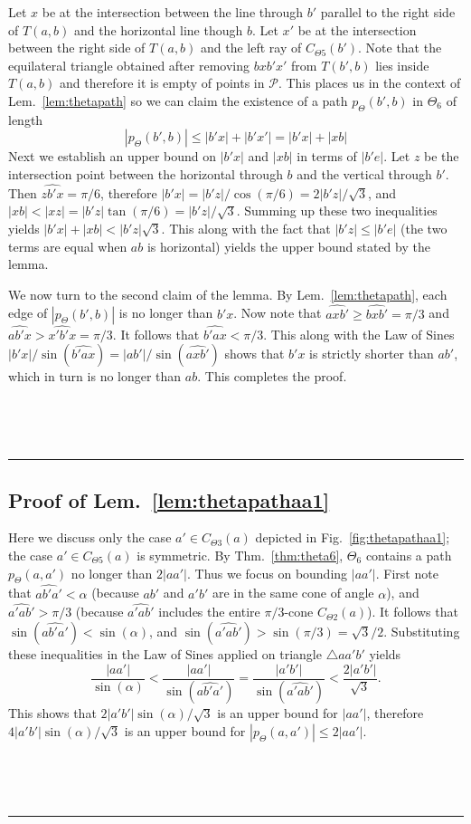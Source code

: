 \documentclass[11pt]{article}
\newcommand\cone{{C}}
\newcommand\Pt{\mathcal P}
\newcommand\ang[1]{\widehat{#1}}
\newcommand{\qed}{\rule{0.5em}{1.5ex}}
\newcommand{\fqed}{{\hfill~\qed}}
\newcommand{\eproof}{{\hfill~\fqed} \vspace{1em}}
\begin{document}
Let $x$ be at the intersection between the line through $b'$ parallel to the right side of $T(a, b)$ and the horizontal line though $b$. Let $x'$ be at the intersection between the right side of $T(a, b)$ and the left ray of $\cone_{\Theta5}(b')$. Note that the equilateral triangle obtained after removing $bxb'x'$ from $T(b',b)$ lies inside $T(a, b)$ and therefore it is empty of points in $\Pt$.
This places us in the context of Lem.~\ref{lem:thetapath} so we can claim the existence of a path $p_\Theta(b',b)$ in $\Theta_6$ of length
\begin{equation}
|p_\Theta(b',b)| \le |b'x| + |b'x'| = |b'x| + |xb|
\label{eq:pbb0}
\end{equation}
Next we establish an upper bound on $|b'x|$ and $|xb|$ in terms of $|b'e|$. Let $z$ be the intersection point between the horizontal through $b$ and the vertical through $b'$. Then $\ang{zb'x} = \pi/6$, therefore $|b'x| = |b'z| / \cos(\pi/6) = 2|b'z|/\sqrt{3}$, and
$|xb| < |xz| = |b'z|\tan(\pi/6) = |b'z| / \sqrt{3}$. Summing up these two inequalities yields
$|b'x| + |xb| < |b'z|\sqrt{3}$. This along with the fact that $|b'z| \le |b'e|$ (the two terms are equal when $ab$ is horizontal) yields the upper bound stated by the lemma.

We now turn to the second claim of the lemma. By Lem.~\ref{lem:thetapath}, each edge of $|p_\Theta(b',b)|$ is no longer than $b'x$. Now note that $\ang{axb'} \ge \ang{bxb'} = \pi/3$ and $\ang{ab'x} > \ang{x'b'x} = \pi/3$. It follows that $\ang{b'ax} < \pi/3$. This along with the Law of Sines $|b'x|/\sin(\ang{b'ax}) = |ab'|/\sin(\ang{axb'})$ shows that $b'x$ is strictly shorter than $ab'$, which in turn is no longer than $ab$. This completes the proof.
\eproof

\subsection{Proof of Lem.~\ref{lem:thetapathaa1}}
Here we discuss only the case $a' \in \cone_{\Theta3}(a)$ depicted in Fig.~\ref{fig:thetapathaa1}; the case $a' \in \cone_{\Theta5}(a)$ is symmetric.
By Thm.~\ref{thm:theta6}, $\Theta_6$ contains a path $p_\Theta(a, a')$ no longer than $2|aa'|$. Thus we focus on bounding $|aa'|$.
First note that $\ang{ab'a'} < \alpha$ (because $ab'$ and $a'b'$ are in the same cone of angle $\alpha$), and $\ang{a'ab'} > \pi/3$ (because $\ang{a'ab'}$ includes the entire $\pi/3$-cone $\cone_{\Theta2}(a)$).
It follows that
$\sin(\ang{ab'a'}) < \sin(\alpha)$, and $\sin(\ang{a'ab'}) > \sin(\pi/3) = \sqrt{3}/2$. Substituting these inequalities in the Law of Sines applied on triangle $\triangle aa'b'$ yields
\[\frac{|aa'|}{\sin(\alpha)} < \frac{|aa'|}{\sin(\ang{ab'a'})} = \frac{|a'b'|}{\sin(\ang{a'ab'})} < \frac{2|a'b'|}{\sqrt{3}}.\]
This shows that $2|a'b'|\sin(\alpha)/\sqrt{3}$ is an upper bound for $|aa'|$, therefore $4|a'b'|\sin(\alpha)/\sqrt{3}$ is an upper bound for $|p_\Theta(a, a')| \le 2|aa'|$.
\eproof
\end{document}
